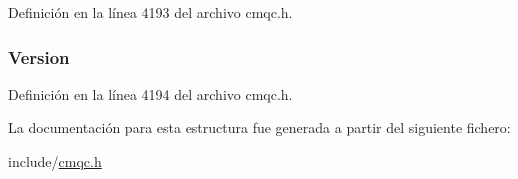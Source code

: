 Definición en la línea 4193 del archivo cmqc.\+h.

\hypertarget{structtag_m_q_d_l_h_a0656ef8f766b3907d394d88a35d7b7e9}{}
\subsubsection[{Version}]{ Version}\label{structtag_m_q_d_l_h_a0656ef8f766b3907d394d88a35d7b7e9}


Definición en la línea 4194 del archivo cmqc.\+h.



La documentación para esta estructura fue generada a partir del siguiente fichero\+:\begin{DoxyCompactItemize}
\item 
include/\hyperlink{cmqc_8h}{cmqc.\+h}\end{DoxyCompactItemize}
